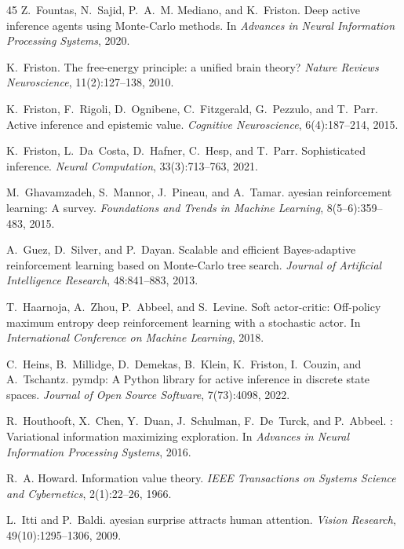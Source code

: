 \documentclass[runningheads]{llncs}
\begin{document}
\begin{thebibliography}{45}
Z.~Fountas, N.~Sajid, P.~A.~M. Mediano, and K.~Friston.
\newblock Deep active inference agents using {M}onte-{C}arlo methods.
\newblock In \emph{Advances in Neural Information Processing Systems}, 2020.

K.~Friston.
\newblock The free-energy principle: a unified brain theory?
\newblock \emph{Nature Reviews Neuroscience}, 11(2):127--138, 2010.

K.~Friston, F.~Rigoli, D.~Ognibene, C.~Fitzgerald, G.~Pezzulo, and T.~Parr.
\newblock Active inference and epistemic value.
\newblock \emph{Cognitive Neuroscience}, 6(4):187--214, 2015.

K.~Friston, L.~Da~Costa, D.~Hafner, C.~Hesp, and T.~Parr.
\newblock Sophisticated inference.
\newblock \emph{Neural Computation}, 33(3):713--763, 2021.

M.~Ghavamzadeh, S.~Mannor, J.~Pineau, and A.~Tamar.
ayesian reinforcement learning: A survey.
\newblock \emph{Foundations and Trends in Machine Learning}, 8(5--6):359--483, 2015.

A.~Guez, D.~Silver, and P.~Dayan.
\newblock Scalable and efficient {B}ayes-adaptive reinforcement learning based on {M}onte-{C}arlo tree search.
\newblock \emph{Journal of Artificial Intelligence Research}, 48:841--883, 2013.

T.~Haarnoja, A.~Zhou, P.~Abbeel, and S.~Levine.
\newblock Soft actor-critic: Off-policy maximum entropy deep reinforcement learning with a stochastic actor.
\newblock In \emph{International Conference on Machine Learning}, 2018.

C.~Heins, B.~Millidge, D.~Demekas, B.~Klein, K.~Friston, I.~Couzin, and A.~Tschantz.
\newblock pymdp: A {P}ython library for active inference in discrete state spaces.
\newblock \emph{Journal of Open Source Software}, 7(73):4098, 2022.

R.~Houthooft, X.~Chen, Y.~Duan, J.~Schulman, F.~De~Turck, and P.~Abbeel.
: Variational information maximizing exploration.
\newblock In \emph{Advances in Neural Information Processing Systems}, 2016.

R.~A. Howard.
\newblock Information value theory.
\newblock \emph{IEEE Transactions on Systems Science and Cybernetics}, 2(1):22--26, 1966.

L.~Itti and P.~Baldi.
ayesian surprise attracts human attention.
\newblock \emph{Vision Research}, 49(10):1295--1306, 2009.


\end{thebibliography}
\end{document}
